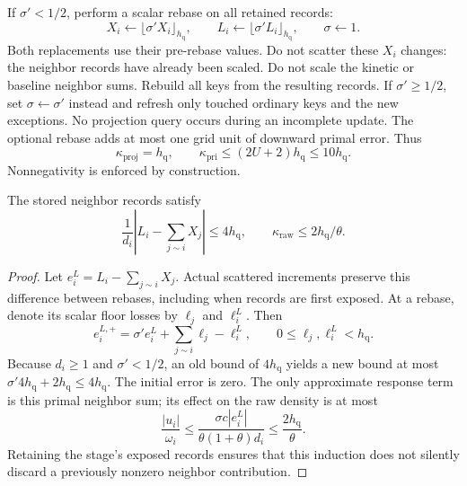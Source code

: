 If $\sigma'<1/2$, perform a scalar rebase on all retained records:
\begin{equation*}
 X_i\gets\lfloor\sigma'X_i\rfloor_{h_{\mathrm{q}}},\qquad
 L_i\gets\lfloor\sigma'L_i\rfloor_{h_{\mathrm{q}}},\qquad
 \sigma\gets1.
\end{equation*}
Both replacements use their pre-rebase values. Do not scatter these $X_i$
changes: the neighbor records have already been scaled. Do not scale the
kinetic or baseline neighbor sums. Rebuild all keys from the resulting
records. If $\sigma'\geq1/2$, set $\sigma\gets\sigma'$ instead and
refresh only touched ordinary keys and the new exceptions. No projection
query occurs during an incomplete update. The optional rebase adds at most
one grid unit of downward primal error. Thus
\begin{equation}
 \kappa_{\mathrm{proj}}=h_{\mathrm{q}},\qquad
 \kappa_{\mathrm{pri}}\leq(2U+2)h_{\mathrm{q}}\leq10h_{\mathrm{q}}.
 \label{eq:bounded-downward-errors}
\end{equation}
Nonnegativity is enforced by construction.

\begin{lemma}
\label{lem:bounded-neighbor-error}
The stored neighbor records satisfy
\begin{equation}
 \frac1{d_i}\left|L_i-\sum_{j\sim i}X_j\right|\leq4h_{\mathrm{q}},
 \qquad \kappa_{\mathrm{raw}}\leq2h_{\mathrm{q}}/\theta.
 \label{eq:bounded-neighbor-error}
\end{equation}
\end{lemma}
\begin{proof}
Let $e_i^L=L_i-\sum_{j\sim i}X_j$. Actual scattered increments preserve
this difference between rebases, including when records are first exposed.
At a rebase, denote its scalar floor losses by $\ell_j$ and $\ell_i^L$.
Then
\[
 e_i^{L,+}=\sigma'e_i^L+\sum_{j\sim i}\ell_j-\ell_i^L,
 \qquad 0\leq\ell_j,\ell_i^L<h_{\mathrm{q}}.
\]
Because $d_i\geq1$ and $\sigma'<1/2$, an old bound of $4h_{\mathrm{q}}$
yields a new bound at most
$\sigma'4h_{\mathrm{q}}+2h_{\mathrm{q}}\leq4h_{\mathrm{q}}$.
The initial error is zero. The only approximate response term is this
primal neighbor sum; its effect on the raw density is at most
\[
 \frac{|u_i|}{\omega_i}
 \leq\frac{\sigma c|e_i^L|}{\theta(1+\theta)d_i}
 \leq\frac{2h_{\mathrm{q}}}\theta.
\]
Retaining the stage's exposed records ensures that this induction does not
silently discard a previously nonzero neighbor contribution.
\end{proof}


